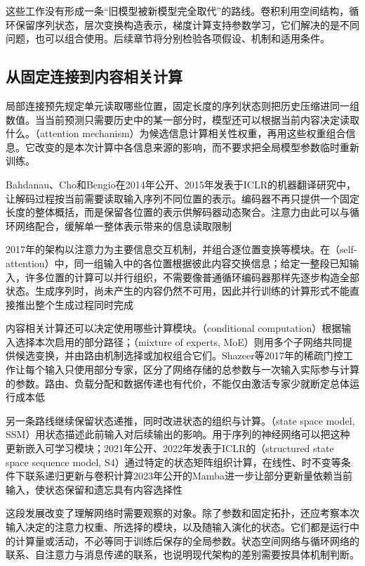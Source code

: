 这些工作没有形成一条“旧模型被新模型完全取代”的路线。卷积利用空间结构，循环保留序列状态，层次变换构造表示，梯度计算支持参数学习，它们解决的是不同问题，也可以组合使用。后续章节将分别检验各项假设、机制和适用条件。

\subsection{从固定连接到内容相关计算}
\label{sec:neural-history-content-dependent}

局部连接预先规定单元读取哪些位置，固定长度的序列状态则把历史压缩进同一组数值。当当前预测只需要历史中的某一部分时，模型还可以根据当前内容决定读取什么。（attention mechanism）为候选信息计算相关性权重，再用这些权重组合信息。它改变的是本次计算中各信息来源的影响，而不要求把全局模型参数临时重新训练。

Bahdanau、Cho和Bengio在2014年公开、2015年发表于ICLR的机器翻译研究中，让解码过程按当前需要读取输入序列不同位置的表示。编码器不再只提供一个固定长度的整体概括，而是保留各位置的表示供解码器动态聚合。注意力由此可以与循环网络配合，缓解单一整体表示带来的信息读取限制

2017年的架构以注意力为主要信息交互机制，并组合逐位置变换等模块。在（self-attention）中，同一组输入中的各位置根据彼此内容交换信息；给定一整段已知输入，许多位置的计算可以并行组织，不需要像普通循环编码器那样先逐步构造全部状态。生成序列时，尚未产生的内容仍然不可用，因此并行训练的计算形式不能直接推出整个生成过程同时完成

内容相关计算还可以决定使用哪些计算模块。（conditional computation）根据输入选择本次启用的部分路径；（mixture of experts, MoE）则用多个子网络共同提供候选变换，并由路由机制选择或加权组合它们。Shazeer等2017年的稀疏门控工作让每个输入只使用部分专家，区分了网络存储的总参数与一次输入实际参与计算的参数。路由、负载分配和数据传递也有代价，不能仅由激活专家少就断定总体运行成本低

另一条路线继续保留状态递推，同时改进状态的组织与计算。（state space model, SSM）用状态描述此前输入对后续输出的影响。用于序列的神经网络可以把这种更新嵌入可学习模块；2021年公开、2022年发表于ICLR的（structured state space sequence model, S4）通过特定的状态矩阵组织计算，在线性、时不变等条件下联系递归更新与卷积计算2023年公开的Mamba进一步让部分更新量依赖当前输入，使状态保留和遗忘具有内容选择性

这段发展改变了理解网络时需要观察的对象。除了参数和固定拓扑，还应考察本次输入决定的注意力权重、所选择的模块，以及随输入演化的状态。它们都是运行中的计算量或活动，不必等同于训练后保存的全局参数。状态空间网络与循环网络的联系、自注意力与消息传递的联系，也说明现代架构的差别需要按具体机制判断。

